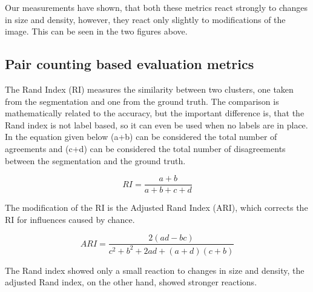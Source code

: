 \documentclass[journal]{IEEEtran}
\begin{document}
Our measurements have shown, that both these metrics react strongly to changes in size and density, however, they react only slightly to modifications of the image. This can be seen in the two figures above.






\subsection{Pair counting based evaluation metrics}

The Rand Index (RI) measures the similarity between two clusters, one taken from the segmentation and one from the ground truth. The comparison is mathematically related to the accuracy, but the important difference is, that the Rand index is not label based, so it can even be used when no labels are in place. In the equation given below (a+b) can be considered the total number of agreements and (c+d) can be considered the total number of disagreements between the segmentation and the ground truth.

\begin{equation} %
	RI = \frac{a+b}{a+b+c+d}
\end{equation}

The modification of the RI is the Adjusted Rand Index (ARI), which corrects the RI for influences caused by chance.

\begin{equation} %
	ARI = \frac{2(ad-bc)}{c^2 + b^2 + 2ad + (a+d)(c+b)}
\end{equation}

The Rand index showed only a small reaction to changes in size and density, the adjusted Rand index, on the other hand, showed stronger reactions.

\end{document}
